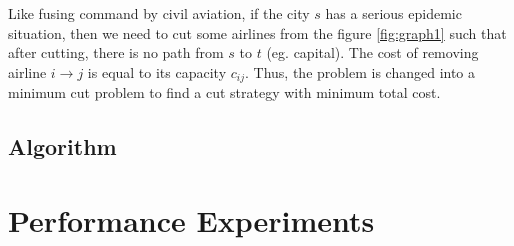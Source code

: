 \documentclass[11pt,twocolumn]{article}
\begin{document}

Like fusing command by civil aviation, if the city $s$ has a serious epidemic situation, then we need to cut some airlines from the figure \ref{fig:graph1} such that
after cutting, there is no path from $s$ to $t$ (eg. capital). The cost of removing airline $i\rightarrow j$ is equal to its capacity $c_{ij}$. Thus, the problem is changed into a minimum cut problem to find a cut strategy with minimum total cost. 







\subsection{Algorithm}





\section{Performance Experiments}
\end{document}
